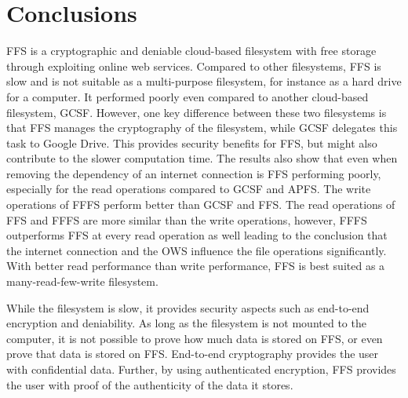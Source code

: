 
\section{Conclusions}
\label{sec:conclusions}
  


FFS is a cryptographic and deniable cloud-based filesystem with free storage through exploiting online web services. Compared to other filesystems, \gls{FFS} is slow and is not suitable as a multi-purpose filesystem, for instance as a hard drive for a computer. It performed poorly even compared to another cloud-based filesystem, \gls{GCSF}. However, one key difference between these two filesystems is that \gls{FFS} manages the cryptography of the filesystem, while \gls{GCSF} delegates this task to Google Drive. This provides security benefits for \gls{FFS}, but might also contribute to the slower computation time. The results also show that even when removing the dependency of an internet connection is \gls{FFS} performing poorly, especially for the read operations compared to \gls{GCSF} and \gls{APFS}. The write operations of \gls{FFFS} perform better than \gls{GCSF} and \gls{FFS}. The read operations of \gls{FFS} and \gls{FFFS} are more similar than the write operations, however, \gls{FFFS} outperforms \gls{FFS} at every read operation as well leading to the conclusion that the internet connection and the \gls{OWS} influence the file operations significantly. With better read performance than write performance, \gls{FFS} is best suited as a many-read-few-write filesystem.

While the filesystem is slow, it provides security aspects such as end-to-end encryption and deniability. As long as the filesystem is not mounted to the computer, it is not possible to prove how much data is stored on \gls{FFS}, or even prove that data is stored on \gls{FFS}. End-to-end cryptography provides the user with confidential data. Further, by using authenticated encryption, \gls{FFS} provides the user with proof of the authenticity of the data it stores. 
